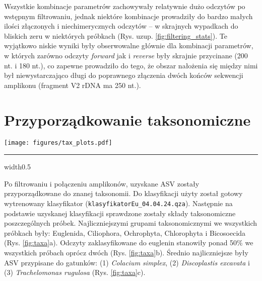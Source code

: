 \documentclass[two column, twoside, a4paper]{article}
\begin{document}
Wszystkie kombinacje parametrów zachowywały relatywnie dużo odczytów po wstępnym filtrowaniu, jednak niektóre kombinacje prowadziły do bardzo małych ilości złączonych i niechimerycznych odczytów -- w skrajnych wypadkach do bliskich zeru w niektórych próbkach (Rys. uzup. \ref{fig:filtering_stats}). Te wyjątkowo niskie wyniki były obserwowalne głównie dla kombinacji parametrów, w których zarówno odczyty \textit{forward} jak i \textit{reverse} były skrajnie przycinane (200 nt. i 180 nt.), co zapewne prowadziło do tego, że obszar nałożenia się między nimi był niewystarczająco długi do poprawnego złączenia dwóch końców sekwencji amplikonu (fragment V2 rDNA ma 250 nt.).

\section{Przyporządkowanie taksonomiczne}

\begin{figure*}
  \begin{center}
    \texttt{[image: figures/tax\_plots.pdf]}
  \end{center}

  \hrule width0.5\textwidth \vspace{0.35em}

  \caption{\textbf{Próbki i poszczególne zbiorniki znacząco różnią się składami taksonomicznymi, oraz udziałem odczytów przypisanych do euglenin.} \textbf{a.} Wykres słupkowy przedstawiający skład taksonomiczny poszczególnych próbek jako procentowy udział wybranych grup taksonomicznych. \textbf{b.} Wykres słupkowy przedstawiający procentowy udział ASV zaklasyfikowanych do grupy Euglenida w poszczególnych próbkach. \textbf{c.} Wykres słupkowy (lewo) pokazujący średnią ilość odczytów przypisanych do danego gatunku i wykres pudełkowy (prawo) przedstawiający rozproszenie i rozkład ilości odczytów przypisanych do danego gatunku w próbkach. \textbf{d.} Wykresy pudełkowe pokazujące rozproszenie udziału procentowego ASV przypisanych do Euglenida w różnych zbiornikach, rejonach Polski i porach roku.}
  \label{fig:taxa}
\end{figure*}

Po filtrowaniu i połączeniu amplikonów, uzyskane ASV zostały przyporządkowane do znanej taksonomii. Do klasyfikacji użyty został gotowy wytrenowany klasyfikator (\texttt{klasyfikatorEu\_04.04.24.qza}). Następnie na podstawie uzyskanej klasyfikacji sprawdzone zostały składy taksonomiczne poszczególnych próbek. Najliczniejszymi grupami taksonomicznymi we wszystkich próbkach były: Euglenida, Ciliophora, Ochrophyta, Chlorophyta i Bicosoecida (Rys. \ref{fig:taxa}a). Odczyty zaklasyfikowane do euglenin stanowiły ponad 50\% we wszystkich próbach oprócz dwóch (Rys. \ref{fig:taxa}b). Średnio najliczniejsze były ASV przypisane do gatunków: (1) \textit{Colacium simplex}, (2) \textit{Discoplastis excavata} i (3) \textit{Trachelomonas rugulosa} (Rys. \ref{fig:taxa}c).
\end{document}
